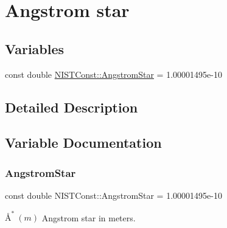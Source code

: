 \hypertarget{group___angstrom_star}{}\section{Angstrom star}
\label{group___angstrom_star}
\subsection*{Variables}
\begin{DoxyCompactItemize}
\item 
const double \hyperlink{group___angstrom_star_ga42db9558ed1ddd9706c14e4d0b0863cc}{N\+I\+S\+T\+Const\+::\+Angstrom\+Star} = 1.\+00001495e-\/10
\end{DoxyCompactItemize}


\subsection{Detailed Description}


\subsection{Variable Documentation}
\mbox{\label{group___angstrom_star_ga42db9558ed1ddd9706c14e4d0b0863cc}} 
\subsubsection{\texorpdfstring{Angstrom\+Star}{AngstromStar}}
{\footnotesize\ttfamily const double N\+I\+S\+T\+Const\+::\+Angstrom\+Star = 1.\+00001495e-\/10}

$\textrm{\AA}^{\ast} \ (m)$ Angstrom star in meters. 